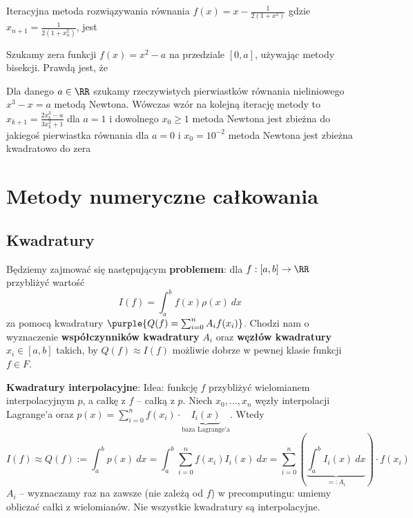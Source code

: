 \begin{problems}
    \prob Iteracyjna metoda rozwiązywania równania $f(x) = x - \frac{1}{2(1+x^2)}$ gdzie $x_{n+1} = \frac{1}{2(1+x_n^2)}$, jest

    \prob Szukamy zera funkcji $f(x) = x^2 - a$ na przedziale $[0, a]$, używając metody bisekcji. Prawdą jest, że

    \prob Dla danego $a \in \RR$ szukamy rzeczywistych pierwiastków równania nieliniowego $x^3 - x = a$ metodą Newtona. Wówczas
    \answers
    {wzór na kolejną iterację metody to $x_{k+1} = \frac{2x^3_k-a}{3x^2_k+1}$}
    {dla $a = 1$ i dowolnego $x_0 \geq 1$ metoda Newtona jest zbieżna do jakiegoś pierwiastka równania}
    {dla $a = 0$ i $x_0 = 10^{-2}$ metoda Newtona jest zbieżna kwadratowo do zera}
\end{problems}

\section{Metody numeryczne całkowania}

\subsection{Kwadratury}
Będziemy zajmować się następującym \textbf{problemem}:
dla $f:[a,b]\to\RR$ przybliżyć wartość
$$
I(f) = \int_a^b f(x)\rho(x)\ dx
$$
za pomocą kwadratury $\purple{Q(f) = \sum_{i=0}^n A_if(x_i)}$. Chodzi nam o wyznaczenie \textbf{współczynników kwadratury} $A_i$ oraz \textbf{węzłów kwadratury} $x_i\in[a,b]$ takich, by $Q(f)\approx I(f)$ możliwie dobrze w pewnej klasie funkcji $f\in F$.

\textbf{Kwadratury interpolacyjne}:
Idea: funkcję $f$ przybliżyć wielomianem interpolacyjnym $p$, a całkę z $f$ -- całką z $p$. Niech $x_0,\ldots,x_n$ węzły interpolacji Lagrange'a oraz $p(x)=\sum_{i=0}^n f(x_i)\cdot\underbrace{I_i(x)}_{\text{baza Lagrange'a}}$. Wtedy
$$
I(f) \approx Q(f) := \int_a^b p(x)\ dx = \int_a^b \sum_{i=0}^n f(x_i)I_i(x)\ dx = \sum_{i=0}^n\left(\underbrace{\int_a^b I_i(x)\ dx}_{=:A_i}\right)\cdot f(x_i)
$$
$A_i$ -- wyznaczamy raz na zawsze (nie zależą od $f$) w precomputingu: umiemy obliczać całki z wielomianów. Nie wszystkie kwadratury są interpolacyjne.

